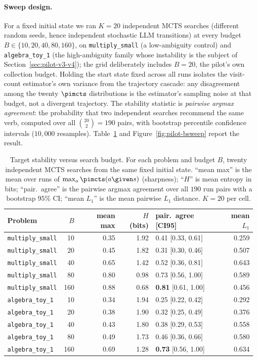 \paragraph{Sweep design.} For a fixed initial state we ran $K = 20$
independent MCTS searches (different random seeds, hence independent
stochastic LLM transitions) at every budget
$B \in \{10, 20, 40, 80, 160\}$, on \texttt{multiply\_small} (a
low-ambiguity control) and \texttt{algebra\_toy\_1} (the high-ambiguity
family whose instability is the subject of
Section~\ref{sec:pilot-v3-v4}); the grid deliberately includes
$B = 20$, the pilot's own collection budget. Holding the start state
fixed across all runs isolates the visit-count estimator's own variance
from the trajectory cascade: any disagreement among the twenty
$\pimcts$ distributions is the estimator's sampling noise at that
budget, not a divergent trajectory. The stability statistic is
\emph{pairwise argmax agreement}: the probability that two independent
searches recommend the same verb, computed over all
$\binom{20}{2} = 190$ pairs, with bootstrap percentile confidence
intervals ($10{,}000$ resamples). Table~\ref{tab:pilot-bsweep} and
Figure~\ref{fig:pilot-bsweep} report the result.

\begin{table}[t]
\centering
\caption{Target stability versus search budget. For each problem and
budget $B$, twenty independent MCTS searches from the same fixed
initial state. ``mean max'' is the mean over runs of
$\max_a \pimcts(a\given s)$ (sharpness); ``$H$'' is mean entropy in
bits; ``pair.\ agree'' is the pairwise argmax agreement over all $190$
run pairs with a bootstrap $95\%$ CI; ``mean $L_1$'' is the mean
pairwise $L_1$ distance. $K=20$ per cell.}
\label{tab:pilot-bsweep}
\small
\begin{tabular}{@{}lrrrlr@{}}
\toprule
Problem & $B$ & mean max & $H$ (bits) & pair.\ agree [CI95] & mean $L_1$ \\
\midrule
\texttt{multiply\_small} &  10 & 0.35 & 1.92 & 0.41 [0.33, 0.61] & 0.259 \\
\texttt{multiply\_small} &  20 & 0.45 & 1.82 & 0.31 [0.30, 0.46] & 0.507 \\
\texttt{multiply\_small} &  40 & 0.65 & 1.42 & 0.52 [0.36, 0.81] & 0.643 \\
\texttt{multiply\_small} &  80 & 0.80 & 0.98 & 0.73 [0.56, 1.00] & 0.589 \\
\texttt{multiply\_small} & 160 & 0.88 & 0.68 & \textbf{0.81} [0.61, 1.00] & 0.456 \\
\texttt{algebra\_toy\_1} &  10 & 0.34 & 1.94 & 0.25 [0.22, 0.42] & 0.292 \\
\texttt{algebra\_toy\_1} &  20 & 0.38 & 1.90 & 0.32 [0.25, 0.49] & 0.376 \\
\texttt{algebra\_toy\_1} &  40 & 0.43 & 1.80 & 0.38 [0.29, 0.53] & 0.558 \\
\texttt{algebra\_toy\_1} &  80 & 0.49 & 1.73 & 0.46 [0.36, 0.66] & 0.580 \\
\texttt{algebra\_toy\_1} & 160 & 0.69 & 1.28 & \textbf{0.73} [0.56, 1.00] & 0.634 \\
\bottomrule
\end{tabular}
\end{table}

